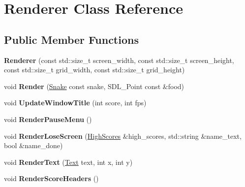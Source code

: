 \hypertarget{classRenderer}{}\section{Renderer Class Reference}
\label{classRenderer}
\subsection*{Public Member Functions}
\begin{DoxyCompactItemize}
\item 
{\bfseries Renderer} (const std\+::size\+\_\+t screen\+\_\+width, const std\+::size\+\_\+t screen\+\_\+height, const std\+::size\+\_\+t grid\+\_\+width, const std\+::size\+\_\+t grid\+\_\+height)\hypertarget{classRenderer_a4f118d3528fbfcc67d1192bb2f64b1b6}{}\label{classRenderer_a4f118d3528fbfcc67d1192bb2f64b1b6}

\item 
void {\bfseries Render} (\hyperlink{classSnake}{Snake} const snake, S\+D\+L\+\_\+\+Point const \&food)\hypertarget{classRenderer_addbaf60ea023fffa1896eea6df278931}{}\label{classRenderer_addbaf60ea023fffa1896eea6df278931}

\item 
void {\bfseries Update\+Window\+Title} (int score, int fps)\hypertarget{classRenderer_a773dd8d3284b57f3c60d6b2100dffdca}{}\label{classRenderer_a773dd8d3284b57f3c60d6b2100dffdca}

\item 
void {\bfseries Render\+Pause\+Menu} ()\hypertarget{classRenderer_a29f6e18482d6df30df546f53d4677742}{}\label{classRenderer_a29f6e18482d6df30df546f53d4677742}

\item 
void {\bfseries Render\+Lose\+Screen} (\hyperlink{classHighScores}{High\+Scores} \&high\+\_\+scores, std\+::string \&name\+\_\+text, bool \&name\+\_\+done)\hypertarget{classRenderer_a5b9e309d3e5764c9e582c0664b6feb7c}{}\label{classRenderer_a5b9e309d3e5764c9e582c0664b6feb7c}

\item 
void {\bfseries Render\+Text} (\hyperlink{classText}{Text} text, int x, int y)\hypertarget{classRenderer_a9633d6f4c0d7e87078a5bb692396be39}{}\label{classRenderer_a9633d6f4c0d7e87078a5bb692396be39}

\item 
void {\bfseries Render\+Score\+Headers} ()\hypertarget{classRenderer_abb0937b0b44e81dc69780e79d78a61ac}{}\label{classRenderer_abb0937b0b44e81dc69780e79d78a61ac}


\end{DoxyCompactItemize}
